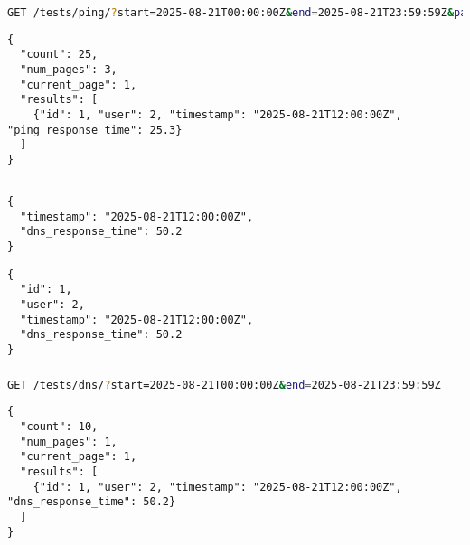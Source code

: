 \documentclass{report}
\begin{document}
\subsubsection{}
\begin{latin}
\begin{lstlisting}[style=jsonstyle, language=bash]
GET /tests/ping/?start=2025-08-21T00:00:00Z&end=2025-08-21T23:59:59Z&page=1&page_size=10
\end{lstlisting}
\end{latin}
\textbf{}
\begin{latin}
\begin{lstlisting}[style=jsonstyle]
{
  "count": 25,
  "num_pages": 3,
  "current_page": 1,
  "results": [
    {"id": 1, "user": 2, "timestamp": "2025-08-21T12:00:00Z", "ping_response_time": 25.3}
  ]
}
\end{lstlisting}
\end{latin}

\subsection{}
\subsubsection{}
\begin{latin}
\begin{lstlisting}[style=jsonstyle]
{
  "timestamp": "2025-08-21T12:00:00Z",
  "dns_response_time": 50.2
}
\end{lstlisting}
\end{latin}
\textbf{}
\begin{latin}
\begin{lstlisting}[style=jsonstyle]
{
  "id": 1,
  "user": 2,
  "timestamp": "2025-08-21T12:00:00Z",
  "dns_response_time": 50.2
}
\end{lstlisting}
\end{latin}

\subsubsection{}
\begin{latin}
\begin{lstlisting}[style=jsonstyle, language=bash]
GET /tests/dns/?start=2025-08-21T00:00:00Z&end=2025-08-21T23:59:59Z
\end{lstlisting}
\end{latin}
\textbf{}
\begin{latin}
\begin{lstlisting}[style=jsonstyle]
{
  "count": 10,
  "num_pages": 1,
  "current_page": 1,
  "results": [
    {"id": 1, "user": 2, "timestamp": "2025-08-21T12:00:00Z", "dns_response_time": 50.2}
  ]
}
\end{lstlisting}
\end{latin}
\end{document}
